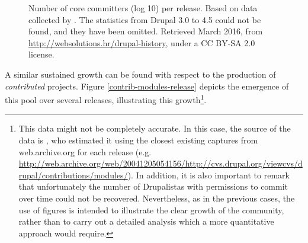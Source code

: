 \begin{figure}[H]
\centering
	\caption[Number of core committers per release]%
    {Number of core committers (log 10) per release. Based on data collected by \textcite{zoubi-history:2016:Online}. The statistics from Drupal 3.0 to 4.5 could not be found, and they have been omitted. Retrieved  March 2016, from \url{http://websolutions.hr/drupal-history}, under a CC BY-SA 2.0 license.}
	\label{core-committers-release}
\end{figure}

A similar sustained growth can be found with respect to the production of \textit{contributed} projects. Figure \ref{contrib-modules-release} depicts the emergence of this pool over several releases, illustrating this growth\footnote{This data might not be completely accurate. In this case, the source of the data is \textcite{zoubi-history:2016:Online}, who estimated it using the closest existing captures from web.archive.org for each release (e.g. \url{http://web.archive.org/web/20041205054156/http://cvs.drupal.org/viewcvs/drupal/contributions/modules/}). In addition, it is also important to remark that unfortunately the number of Drupalistas with permissions to commit over time could not be recovered. Nevertheless, as in the previous cases, the use of figures is intended to illustrate the clear growth of the community, rather than to carry out a detailed analysis which a more quantitative approach would require.}.

